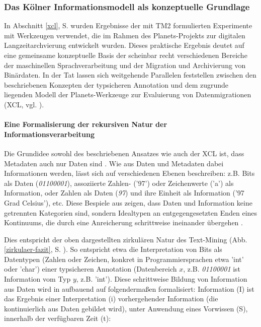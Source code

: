 \documentclass[abstracton, 12pt]{scrartcl}
\begin{document}
\subsubsection{Das Kölner Informationsmodell als konzeptuelle Grundlage}

In Abschnitt \ref{xcl}, S. \pageref{xcl} wurden Ergebnisse der mit TM2 formulierten Experimente mit Werkzeugen verwendet, die im Rahmen des Planets-Projekts zur digitalen Langzeitarchvierung entwickelt wurden. Dieses praktische Ergebnis deutet auf eine gemeinsame konzeptuelle Basis der scheinbar recht verschiedenen Bereiche der maschinellen Sprachverarbeitung und der Migration und Archivierung von Binärdaten. In der Tat lassen sich weitgehende Parallelen feststellen zwischen den beschriebenen Konzepten der typsicheren Annotation und dem zugrunde liegenden Modell der Planets-Werkzeuge zur Evaluierung von Datenmigrationen (XCL, vgl. \citealt{Thaller2009}).

\paragraph{Eine Formalisierung der rekursiven Natur der Informationsverarbeitung}

Die Grundidee sowohl des beschriebenen Ansatzes wie auch der XCL ist, dass Metadaten auch nur Daten sind \citep[223]{Thaller2009b}. Wie aus Daten und Metadaten dabei Informationen werden, lässt sich auf verschiedenen Ebenen beschreiben: z.B. Bits als Daten (\emph{01100001}), assoziierte Zahlen- ('97') oder Zeichenwerte ('a') als Information, oder Zahlen als Daten (\emph{97}) und ihre Einheit als Information ('97 Grad Celsius'), etc. Diese Bespiele aus \citet{Thaller2009} zeigen, dass Daten und Information keine getrennten Kategorien sind, sondern Idealtypen an entgegengesetzten Enden eines Kontinuums, die durch eine Anreicherung schrittweise ineinander übergehen \citep[226]{Thaller2009b}.

Dies entspricht der oben dargestellten zirkulären Natur des Text-Mining (Abb. \ref{zirkulaer-fazit}, S. \pageref{zirkulaer-fazit}). So entspricht etwa die Interpretation von Bits als Datentypen (Zahlen oder Zeichen, konkret in Programmiersprachen etwa 'int' oder 'char') einer typsicheren Annotation (Datenbereich $x$, z.B. \emph{01100001} ist Information vom Typ $y$, z.B. 'int'). Diese schrittweise Bildung von Information aus Daten wird in \citet[224]{Thaller2009b} aufbauend auf \citet{Langefors1995} folgendermaßen formalisiert: Information (I) ist das Ergebnis einer Interpretation (i) vorhergehender Information (die kontinuierlich aus Daten gebildet wird), unter Anwendung eines Vorwissen (S), innerhalb der verfügbaren Zeit (t):
\end{document}
